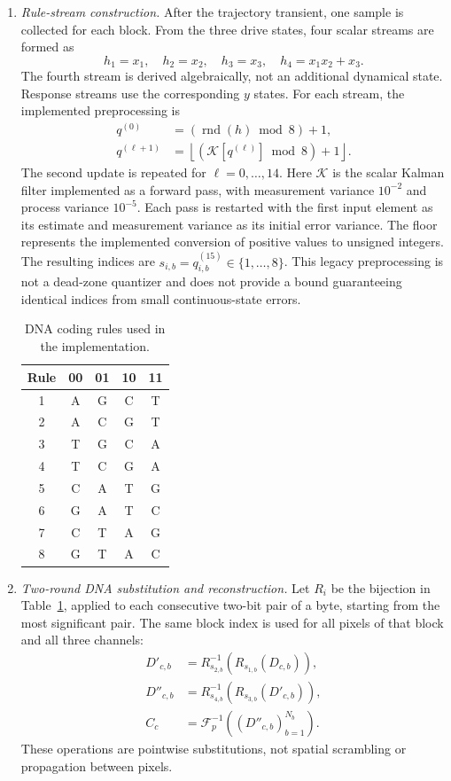 \documentclass[a4paper,fleqn]{cas-sc}
\theoremstyle{plain}
\theoremstyle{definition}
\begin{document}
\begin{enumerate}
\item \textit{Rule-stream construction.}
After the trajectory transient, one sample is collected for each block. From the three drive states, four scalar streams are formed as
\begin{equation}
h_1=x_1,\quad h_2=x_2,\quad h_3=x_3,\quad h_4=x_1x_2+x_3.
\end{equation}
The fourth stream is derived algebraically, not an additional dynamical state. Response streams use the corresponding $y$ states. For each stream, the implemented preprocessing is
\begin{align}
q^{(0)}&=(\operatorname{rnd}(h)\bmod8)+1,\\
q^{(\ell+1)}&=\left\lfloor
(\mathcal K[q^{(\ell)}]\bmod8)+1\right\rfloor.
\end{align}
The second update is repeated for $\ell=0,\ldots,14$. Here $\mathcal K$ is the scalar Kalman filter implemented as a forward pass, with measurement variance $10^{-2}$ and process variance $10^{-5}$. Each pass is restarted with the first input element as its estimate and measurement variance as its initial error variance. The floor represents the implemented conversion of positive values to unsigned integers. The resulting indices are $s_{i,b}=q_{i,b}^{(15)}\in\{1,\ldots,8\}$. This legacy preprocessing is not a dead-zone quantizer and does not provide a bound guaranteeing identical indices from small continuous-state errors.

\begin{table}[pos=htbp]
\centering
\caption{DNA coding rules used in the implementation.}
\label{tab:dna_rules}
\begin{tabular}{c|cccc}
\hline
Rule & 00 & 01 & 10 & 11 \\
\hline
1 & A & G & C & T \\
2 & A & C & G & T \\
3 & T & G & C & A \\
4 & T & C & G & A \\
5 & C & A & T & G \\
6 & G & A & T & C \\
7 & C & T & A & G \\
8 & G & T & A & C \\
\hline
\end{tabular}
\end{table}

\item \textit{Two-round DNA substitution and reconstruction.}
Let $R_i$ be the bijection in Table~\ref{tab:dna_rules}, applied to each consecutive two-bit pair of a byte, starting from the most significant pair. The same block index is used for all pixels of that block and all three channels:
\begin{align}
D'_{c,b}&=R_{s_{2,b}}^{-1}(R_{s_{1,b}}(D_{c,b})),\\
D''_{c,b}&=R_{s_{4,b}}^{-1}(R_{s_{3,b}}(D'_{c,b})),\\
C_c&=\mathcal F_p^{-1}((D''_{c,b})_{b=1}^{N_b}).
\end{align}
These operations are pointwise substitutions, not spatial scrambling or propagation between pixels.
\end{enumerate}
\end{document}

